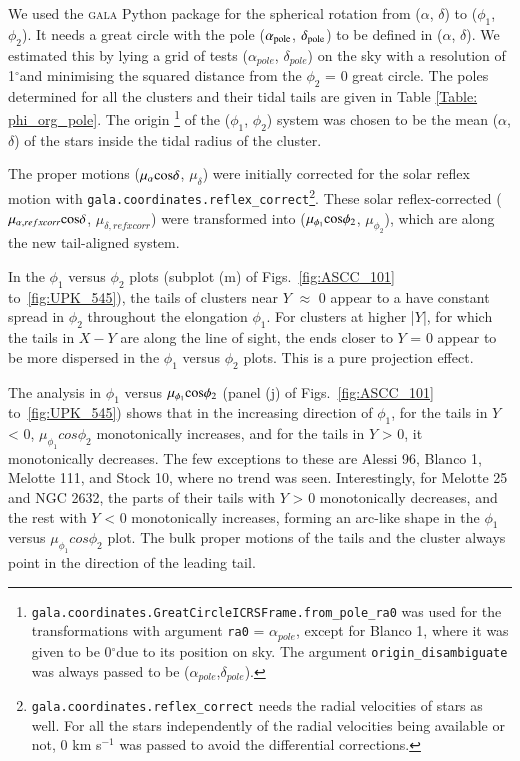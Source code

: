 \documentclass{aa}
\newcommand\arcdeg{\mbox{$^\circ$}}%
\begin{document}
We used the \textsc{gala} \citep{2017JOSS....2..388Price} Python package for the spherical rotation from ($\alpha$, $\delta$) to ($\phi_1$, $\phi_2$). It needs a great circle with the pole ($\alpha_{\rm{pole}}$, $\delta_{\rm{pole}}$) to be defined in ($\alpha$, $\delta$). We estimated this by lying a grid of tests ($\alpha_{pole}$, $\delta_{pole}$) on the sky with a resolution of 1\arcdeg and minimising the squared distance from the $\phi_2$ = 0 great circle. The poles determined for all the clusters and their tidal tails are given in Table \ref{Table: phi_org_pole}. The origin
\footnote{\texttt{gala.coordinates.GreatCircleICRSFrame.from\_pole\_ra0} was used for the transformations with argument \texttt{ra0} = $\alpha_{pole}$, except for Blanco 1, where it was given to be 0\arcdeg due to its position on sky. The argument \texttt{origin\_disambiguate} was always passed to be ($\alpha_{pole}$,$\delta_{pole}$).}  
of the ($\phi_1$, $\phi_2$) system was chosen to be the mean ($\alpha$, $\delta$) of the stars inside the tidal radius of the cluster. 


The proper motions ($\mu_{\alpha} \rm{cos} \delta $, $\mu_{\delta}$) were initially corrected for the solar reflex motion with \texttt{gala.coordinates.reflex\_correct}\footnote{\texttt{gala.coordinates.reflex\_correct} needs the radial velocities of stars as well. For all the stars independently of the radial velocities being available or not, 0 km s$^{-1}$ was passed to avoid the differential corrections.}.
These solar reflex-corrected ($\mu_{\alpha, refxcorr} \rm{cos} \delta $, $\mu_{\delta, refxcorr}$) were transformed into ($\mu_{\phi_{1}} \rm{cos} \phi_2 $, $\mu_{\phi_{2}}$), which are along the new tail-aligned system.


In the $\phi_1$ versus $\phi_2$ plots (subplot (m) of Figs.~\ref{fig:ASCC_101} to~\ref{fig:UPK_545}), the tails of clusters near $Y$ $\approx$ 0 appear to a have constant spread in $\phi_2$ throughout the elongation $\phi_1$. For clusters at higher |$Y$|, for which the tails in $X-Y$ are along the line of sight, the ends closer to $Y$ = 0 appear to be more dispersed in the  $\phi_1$ versus $\phi_2$ plots. This is a pure projection effect. 

The analysis in $\phi_1$ versus $\mu_{\phi_{1}} \rm{cos} \phi_2 $ (panel (j) of Figs.~\ref{fig:ASCC_101} to~\ref{fig:UPK_545}) shows that in the increasing direction of $\phi_1$, for the tails in $Y$ < 0,  $\mu_{\phi_{1}} cos \phi_2 $ monotonically increases, and for the tails in $Y$ > 0, it monotonically decreases. The few exceptions to these are Alessi 96, Blanco 1, Melotte 111, and Stock 10, where no trend was seen. Interestingly, for Melotte 25 and NGC 2632, the parts of their tails with $Y$ > 0 monotonically decreases, and the rest with $Y$ < 0 monotonically increases, forming an arc-like shape in the $\phi_1$ versus $\mu_{\phi_{1}} cos \phi_2 $ plot. The bulk proper motions of the tails and the cluster always point in the direction of the leading tail.
\end{document}
